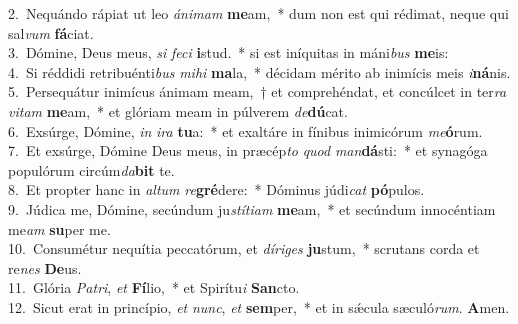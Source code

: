 {2.~}Nequándo rápiat ut leo \textit{á}\textit{ni}\textit{mam} \textbf{me}am,~* dum non est qui rédimat, neque qui sal\textit{vum} \textbf{fá}ciat.\\
{3.~}Dómine, Deus meus, \textit{si} \textit{fe}\textit{ci} \textbf{i}stud.~* si est iníquitas in máni\textit{bus} \textbf{me}is:\\
{4.~}Si réddidi retribuénti\textit{bus} \textit{mi}\textit{hi} \textbf{ma}la,~* décidam mérito ab inimícis meis \textit{i}\textbf{ná}nis.\\
{5.~}Persequátur inimícus ánimam meam,~† et comprehéndat, et concúlcet in ter\textit{ra} \textit{vi}\textit{tam} \textbf{me}am,~* et glóriam meam in púlverem \textit{de}\textbf{dú}cat.\\
{6.~}Exsúrge, Dómine, \textit{in} \textit{i}\textit{ra} \textbf{tu}a:~* et exaltáre in fínibus inimicórum \textit{me}\textbf{ó}rum.\\
{7.~}Et exsúrge, Dómine Deus meus, in præcép\textit{to} \textit{quod} \textit{man}\textbf{dá}sti:~* et synagóga populórum circúm\textit{da}\textbf{bit} te.\\
{8.~}Et propter hanc in \textit{al}\textit{tum} \textit{re}\textbf{gré}dere:~* Dóminus júdi\textit{cat} \textbf{pó}pulos.\\
{9.~}Júdica me, Dómine, secúndum ju\textit{stí}\textit{ti}\textit{am} \textbf{me}am,~* et secúndum innocéntiam me\textit{am} \textbf{su}per me.\\
{10.~}Consumétur nequítia peccatórum, et \textit{dí}\textit{ri}\textit{ges} \textbf{ju}stum,~* scrutans corda et re\textit{nes} \textbf{De}us.\\
{11.~}Glória \textit{Pa}\textit{tri}, \textit{et} \textbf{Fí}lio,~* et Spirítu\textit{i} \textbf{San}cto.\\
{12.~}Sicut erat in princípio, \textit{et} \textit{nunc}, \textit{et} \textbf{sem}per,~* et in sǽcula sæculó\textit{rum}. \textbf{A}men.\\

